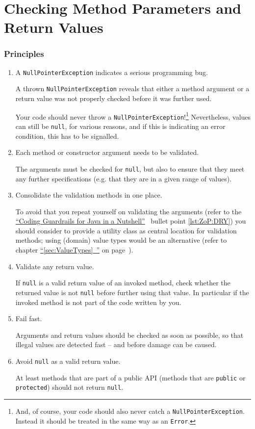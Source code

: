 \documentclass[11pt,a4paper, titlepage, parskip=half, headsepline, footsepline, cleardoublepage=current, headheight=1cm]{scrbook}
\newcommand*{\tqfullvref}[1]{\hyperref[{#1}]{“\ref*{#1}~\nameref*{#1}”} on page~\pageref{#1}}
\newcommand*{\ngref}{\hyperref[lst:NutshellGuardrails]{“Coding Guardrails for Java in a Nutshell”}}
\begin{document}
\section{Checking Method Parameters and Return Values}\label{sec:CheckingMethodParametersAndReturnValues}

\subsubsection{Principles}
\begin{enumerate}[label=P\arabic*.]
\item{A \lstinline|NullPointerException| indicates a serious programming bug.

A thrown \lstinline|NullPointerException|\autocite{ORACLE_DOC_NULLPOINTEREXCEPTION_CLASS} reveals that either a method argument or a return value was not properly checked before it was further used.

Your code should never throw a \lstinline|NullPointerException|!\footnote{And, of course, your code should also never catch a \lstinline|NullPointerException|. Instead it should be treated in the same way as an \lstinline|Error|.} Nevertheless, values can still be \lstinline|null|, for various reasons, and if this is indicating an error condition, this has to be signalled.}

\item{Each method or constructor argument needs to be validated.

The arguments must be checked for \lstinline|null|, but also to ensure that they meet any further specifications (e.g. that they are in a given range of values).}

\item{Consolidate the validation methods in one place.

To avoid that you repeat yourself on validating the arguments (refer to the \ngref~ bullet point \ref{lst:ZoP:DRY}) you should consider to provide a utility class as central location for validation methods; using (domain) value types would be an alternative (refer to chapter \tqfullvref{sec:ValueTypes}).}

\item{Validate any return value.

If \lstinline|null| is a valid return value of an invoked method, check whether the returned value is not \lstinline|null| before further using that value. In particular if the invoked method is not part of the code written by you.}

\item{Fail fast.

Arguments and return values should be checked as soon as possible, so that illegal values are detected fast – and before damage can be caused.}

\item{Avoid \lstinline|null| as a valid return value.

At least methods that are part of a public API (methods that are \lstinline|public| or \lstinline|protected|) should not return \lstinline|null|.}
\end{enumerate}
\end{document}
